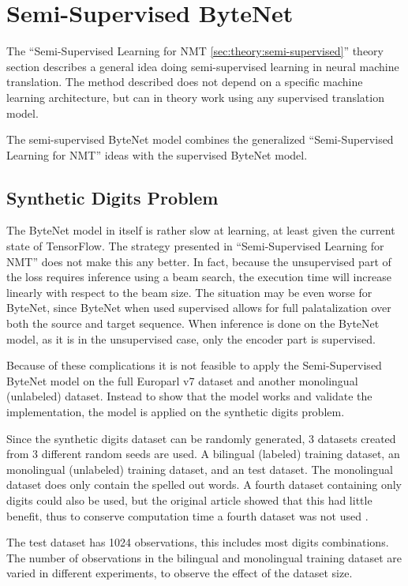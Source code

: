 
\section{Semi-Supervised ByteNet}

The ``Semi-Supervised Learning for NMT \ref{sec:theory:semi-supervised}'' theory section describes a general idea doing semi-supervised learning in neural machine translation. The method described does not depend on a specific machine learning architecture, but can in theory work using any supervised translation model.

The semi-supervised ByteNet model combines the generalized ``Semi-Supervised Learning for NMT'' ideas with the supervised ByteNet model.

\subsection{Synthetic Digits Problem}

The ByteNet model in itself is rather slow at learning, at least given the current state of TensorFlow. The strategy presented in ``Semi-Supervised Learning for NMT'' does not make this any better. In fact, because the unsupervised part of the loss requires inference using a beam search, the execution time will increase linearly with respect to the beam size. The situation may be even worse for ByteNet, since ByteNet when used supervised allows for full palatalization over both the source and target sequence. When inference is done on the ByteNet model, as it is in the unsupervised case, only the encoder part is supervised.

Because of these complications it is not feasible to apply the Semi-Supervised ByteNet model on the full Europarl v7 dataset and another monolingual (unlabeled) dataset. Instead to show that the model works and validate the implementation, the model is applied on the synthetic digits problem.

Since the synthetic digits dataset can be randomly generated, 3 datasets created from 3 different random seeds are used. A bilingual (labeled) training dataset, an monolingual (unlabeled) training dataset, and an test dataset. The monolingual dataset does only contain the spelled out words. A fourth dataset containing only digits could also be used, but the original article showed that this had little benefit, thus to conserve computation time a fourth dataset was not used \cite{semi-supervied}.

The test dataset has 1024 observations, this includes most digits combinations. The number of observations in the bilingual and monolingual training dataset are varied in different experiments, to observe the effect of the dataset size.

